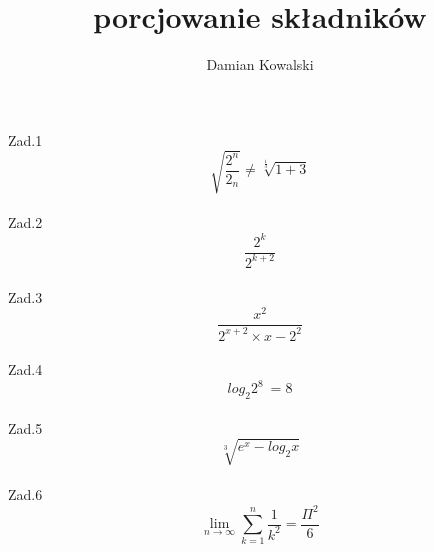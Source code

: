 \documentclass[12pt, letterpaper, titlepage]{article}
\title{porcjowanie składników}
\author{Damian Kowalski}
\begin{document}
\maketitle
\newpage

Zad.1
$$ \sqrt{ \frac{2^n}{2_n}} \neq \sqrt[\frac{1}{3}]{1+3}$$\\
Zad.2
$$ \frac{2^k}{2^{k+2}} $$\\
Zad.3
$$ \frac{x^2}{2^{x+2}\times{x-2}^2}$$\\
Zad.4
$$ log_2 2^8 \ = 8 $$\\
Zad.5
$$ \sqrt[3]{e^x - log_2 x} $$\\
Zad.6
$$ \lim_{n\rightarrow\infty} \sum^{n}_{k=1} \frac{1}{k^2} = \frac{\Pi^2}{6} $$
\end{document}
